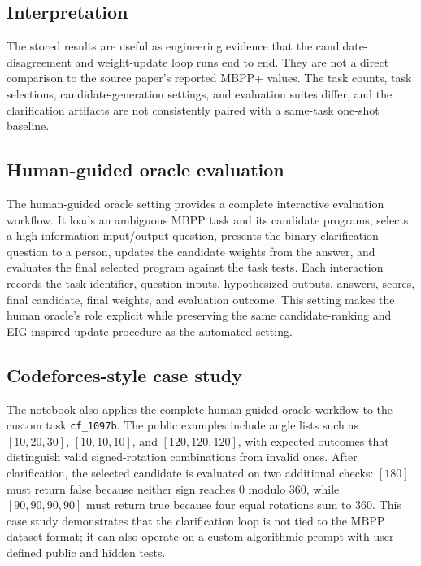 \subsection{Interpretation}

The stored results are useful as engineering evidence that the candidate-disagreement and weight-update loop runs end to end. They are not a direct comparison to the source paper's reported MBPP+ values. The task counts, task selections, candidate-generation settings, and evaluation suites differ, and the clarification artifacts are not consistently paired with a same-task one-shot baseline.

\subsection{Human-guided oracle evaluation}

The human-guided oracle setting provides a complete interactive evaluation workflow. It loads an ambiguous MBPP task and its candidate programs, selects a high-information input/output question, presents the binary clarification question to a person, updates the candidate weights from the answer, and evaluates the final selected program against the task tests. Each interaction records the task identifier, question inputs, hypothesized outputs, answers, scores, final candidate, final weights, and evaluation outcome. This setting makes the human oracle's role explicit while preserving the same candidate-ranking and EIG-inspired update procedure as the automated setting.

\subsection{Codeforces-style case study}

The notebook also applies the complete human-guided oracle workflow to the custom task \texttt{cf\_1097b}. The public examples include angle lists such as $[10,20,30]$, $[10,10,10]$, and $[120,120,120]$, with expected outcomes that distinguish valid signed-rotation combinations from invalid ones. After clarification, the selected candidate is evaluated on two additional checks: $[180]$ must return false because neither sign reaches $0$ modulo $360$, while $[90,90,90,90]$ must return true because four equal rotations sum to $360$. This case study demonstrates that the clarification loop is not tied to the MBPP dataset format; it can also operate on a custom algorithmic prompt with user-defined public and hidden tests.

